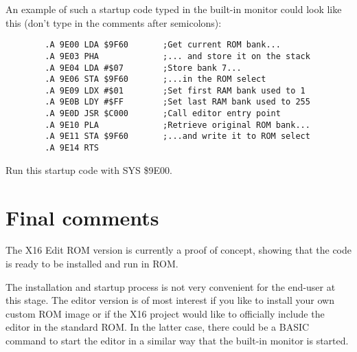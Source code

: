 \documentclass{article}
\begin{document}
    \noindent An example of such a startup code typed in the built-in monitor could look like this (don't type in the comments after semicolons):

    \begin{verbatim}
        .A 9E00 LDA $9F60       ;Get current ROM bank...
        .A 9E03 PHA             ;... and store it on the stack
        .A 9E04 LDA #$07        ;Store bank 7...
        .A 9E06 STA $9F60       ;...in the ROM select
        .A 9E09 LDX #$01        ;Set first RAM bank used to 1
        .A 9E0B LDY #$FF        ;Set last RAM bank used to 255
        .A 9E0D JSR $C000       ;Call editor entry point
        .A 9E10 PLA             ;Retrieve original ROM bank...
        .A 9E11 STA $9F60       ;...and write it to ROM select
        .A 9E14 RTS
    \end{verbatim}

    \noindent Run this startup code with SYS \$9E00.

\section{Final comments}

    The X16 Edit ROM version is currently a proof of concept, showing that the code is ready to be installed and run in ROM.
    
    The installation and startup process is not very convenient for the end-user at this stage. The editor version is of most
    interest if you like to install your own custom ROM image or if the X16 project would like to officially include the
    editor in the standard ROM. In the latter case, there could be a BASIC command to start the editor in a similar way
    that the built-in monitor is started.
\end{document}
